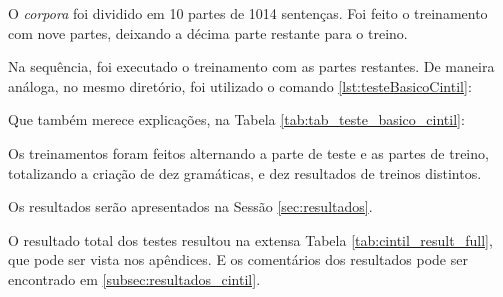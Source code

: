 O \textit{corpora} foi dividido em 10 partes de 1014 sentenças. Foi feito o treinamento com nove partes, deixando a décima parte restante para o treino. 

Na sequência, foi executado o treinamento com as partes restantes. De maneira análoga, no mesmo diretório, foi utilizado o comando \ref{lst:testeBasicoCintil}:

\begin{center}
    
\end{center}

Que também merece explicações, na Tabela \ref{tab:tab_teste_basico_cintil}:
\begin{center}
    
\end{center}

Os treinamentos foram feitos alternando a parte de teste e as partes de treino, totalizando a criação de dez gramáticas, e dez resultados de treinos distintos.

Os resultados serão apresentados na Sessão \ref{sec:resultados}.

O resultado total dos testes resultou na extensa Tabela \ref{tab:cintil_result_full}, que pode ser vista nos apêndices. E os comentários dos resultados pode ser encontrado em \ref{subsec:resultados_cintil}.